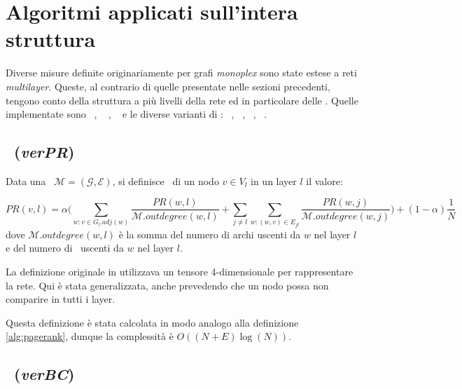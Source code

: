 \section{Algoritmi applicati sull'intera struttura}
Diverse misure definite originariamente per grafi \textit{monoplex} sono state estese a 
reti \textit{multilayer}. Queste, al contrario di quelle presentate nelle sezioni precedenti,
tengono conto della struttura a più livelli della rete ed in particolare delle \interc.
Quelle implementate sono 
\verPageRank~\cite{dedomenico:versatile},
\verBetweennessCentrality~\cite{dedomenico:versatile} \cite{dedomenico:verbetw},
\multiCore~\cite{azimi:multikcore} e le diverse varianti di \PCI: 
\mlPCI~\cite{basaras:infspmul},
\laPCI~\cite{basaras:infspmul},
\alPCI~\cite{basaras:infspmul},
\lsPCI~\cite{basaras:infspmul}.

\subsection{\verPageRank~(\textit{verPR})}
\begin{definizione}[\verPageRank]
    Data una \muln\ $\mathcal{M}=(\mathcal{G}, \mathcal{E})$,
    si definisce \verPageRank\ di un nodo $v \in V_l$ in un layer $l$
    il valore:

    \begin{equation}
        PR(v, l) = 
        \alpha \biggl( 
            \sum_{w : v \in G_l.adj(w)} \frac{PR(w, l)}{\mathcal{M}.outdegree(w, l)} +
            \sum_{j \neq l}^{}\sum_{w : (w, v) \in E_{jl}} \frac{PR(w, j)}{\mathcal{M}.outdegree(w, j)} 
        \biggr) + (1-\alpha)\frac{1}{N}
    \end{equation}
    dove $\mathcal{M}.outdegree(w, l)$ è la somma del numero di archi uscenti da $w$ nel layer $l$
    e del numero di \interc\ uscenti da $w$ nel layer $l$.

\end{definizione}

La definizione originale in \cite{dedomenico:versatile} utilizzava un tensore 4-dimensionale per 
rappresentare la rete. Qui è stata generalizzata, anche prevedendo che un nodo possa non comparire 
in tutti i layer.

Questa definizione è stata calcolata in modo analogo alla definizione \vref{alg:pagerank},
dunque la complessità è $O((N + E)\log(N))$.

\subsection{\verBetweennessCentrality~(\textit{verBC})}

